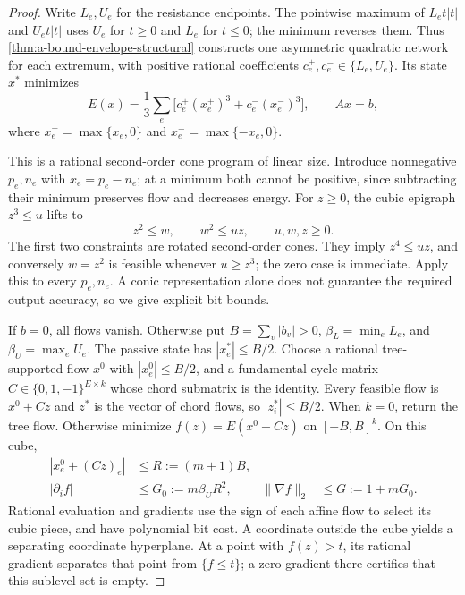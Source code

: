 \begin{proof}
Write $L_e,U_e$ for the resistance endpoints. The pointwise maximum of
$L_et|t|$ and $U_et|t|$ uses $U_e$ for $t\ge0$ and $L_e$ for $t\le0$;
the minimum reverses them. Thus \cref{thm:a-bound-envelope-structural}
constructs one asymmetric quadratic network for each extremum, with
positive rational coefficients $c_e^+,c_e^-\in\{L_e,U_e\}$. Its state
$x^*$ minimizes
\begin{equation}
 E(x)=\frac13\sum_e\bigl[c_e^+(x_e^+)^3+c_e^-(x_e^-)^3\bigr],
 \qquad Ax=b,
 \label{eq:a-bound-cubic-energy}
\end{equation}
where $x_e^+=\max\{x_e,0\}$ and $x_e^-=\max\{-x_e,0\}$.

This is a rational second-order cone program of linear size. Introduce
nonnegative $p_e,n_e$ with $x_e=p_e-n_e$; at a minimum both cannot be
positive, since subtracting their minimum preserves flow and decreases
energy. For $z\ge0$, the cubic epigraph $z^3\le u$ lifts to
\[
 z^2\le w,\qquad w^2\le uz,\qquad u,w,z\ge0.
\]
The first two constraints are rotated second-order cones. They imply
$z^4\le uz$, and conversely $w=z^2$ is feasible whenever $u\ge z^3$;
the zero case is immediate. Apply this to every $p_e,n_e$.
A conic representation alone does not guarantee the required output
accuracy, so we give explicit bit bounds.

If $b=0$, all flows vanish. Otherwise put
$B=\sum_v|b_v|>0$, $\beta_L=\min_e L_e$, and $\beta_U=\max_e U_e$.
The passive state has $|x_e^*|\le B/2$. Choose a rational tree-supported
flow $x^0$ with $|x_e^0|\le B/2$, and a fundamental-cycle matrix
$C\in\{0,1,-1\}^{E\times k}$ whose chord submatrix is the identity.
Every feasible flow is $x^0+Cz$ and $z^*$ is the vector of chord flows,
so $|z_i^*|\le B/2$. When $k=0$, return the tree flow. Otherwise
minimize $f(z)=E(x^0+Cz)$ on $[-B,B]^k$. On this cube,
\[
 \begin{aligned}
 |x_e^0+(Cz)_e|&\le R:=(m+1)B,\\
 |\partial_i f|&\le G_0:=m\beta_U R^2,
 &\|\nabla f\|_2&\le G:=1+mG_0.
 \end{aligned}
\]
Rational evaluation and gradients use the sign of each affine flow to
select its cubic piece, and have polynomial bit cost. A coordinate
outside the cube yields a separating coordinate hyperplane. At a point
with $f(z)>t$, its rational gradient separates that point from
$\{f\le t\}$; a zero gradient there certifies that this sublevel set is empty.


\end{proof}
